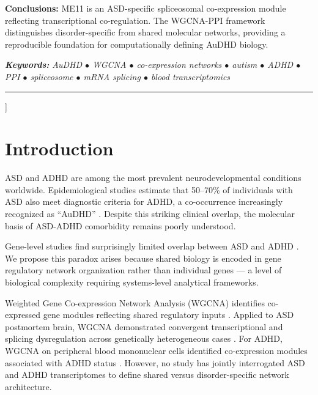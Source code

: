 \documentclass[10pt,twocolumn]{article}
\begin{document}
{\begin{@twocolumnfalse}
\begin{mdframed}[
  backgroundcolor=lgrey,
  linecolor=navy,
  linewidth=1pt,
  innertopmargin=8pt,
  innerbottommargin=8pt,
  innerleftmargin=10pt,
  innerrightmargin=10pt
]
\medskip
\textbf{Conclusions:} ME11 is an ASD-specific spliceosomal co-expression module reflecting
transcriptional co-regulation. The WGCNA-PPI framework distinguishes disorder-specific from
shared molecular networks, providing a reproducible foundation for computationally defining
AuDHD biology.

\medskip
\textit{\textbf{Keywords:} AuDHD $\bullet$ WGCNA $\bullet$ co-expression networks $\bullet$
autism $\bullet$ ADHD $\bullet$ PPI $\bullet$ spliceosome $\bullet$ mRNA splicing $\bullet$
blood transcriptomics}
\end{mdframed}

\vspace{1em}
\noindent\color{lgrey}\rule{\linewidth}{0.5pt}
\vspace{0.5em}

\end{@twocolumnfalse}
}]


\section{Introduction}

ASD and ADHD are among the most prevalent neurodevelopmental conditions worldwide.
Epidemiological studies estimate that 50--70\% of individuals with ASD also meet diagnostic
criteria for ADHD, a co-occurrence increasingly recognized as ``AuDHD'' \citep{vanderbilt2024,
apa2024}. Despite this striking clinical overlap, the molecular basis of ASD-ADHD
comorbidity remains poorly understood.

Gene-level studies find surprisingly limited overlap between ASD and ADHD \citep{mallard2024}.
We propose this paradox arises because shared biology is encoded in gene regulatory network
organization rather than individual genes --- a level of biological complexity requiring
systems-level analytical frameworks.

Weighted Gene Co-expression Network Analysis (WGCNA) identifies co-expressed gene modules
reflecting shared regulatory inputs \citep{langfelder2008}. Applied to ASD postmortem brain,
WGCNA demonstrated convergent transcriptional and splicing dysregulation across genetically
heterogeneous cases \citep{voineagu2011}. For ADHD, WGCNA on peripheral blood mononuclear
cells identified co-expression modules associated with ADHD status \citep{thapar2022}.
However, no study has jointly interrogated ASD and ADHD transcriptomes to define shared
versus disorder-specific network architecture.
\end{document}
